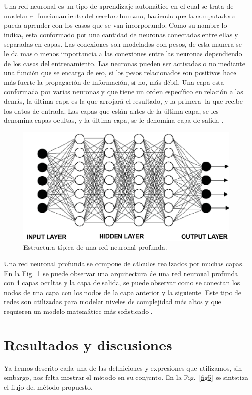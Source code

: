 \documentclass[conference]{IEEEtran}
\begin{document}
Una red neuronal es un tipo de aprendizaje automático en el cual se trata de modelar el funcionamiento del cerebro humano, haciendo que la computadora pueda aprender con los casos que se van incorporando. Como su nombre lo indica, esta conformado por una cantidad de neuronas conectadas entre ellas y separadas en capas. Las conexiones son modeladas con pesos, de esta manera se le da mas o menos importancia a las conexiones entre las neuronas dependiendo de los casos del entrenamiento. Las neuronas pueden ser activadas o no mediante una función que se encarga de eso, si los pesos relacionados son positivos hace más fuerte la propagación de información, si no, más débil. Una capa esta conformada por varias neuronas y que tiene un orden específico en relación a las demás, la última capa es la que arrojará el resultado, y la primera, la que recibe los datos de entrada. Las capas que están antes de la última capa, se les denomina capas ocultas, y la última capa, se le denomina capa de salida \cite{b11}. 

\begin{figure}[htbp]
	\centerline{\includegraphics[scale=0.6]{fig4.png}}
	\caption{Estructura típica de una red neuronal profunda.}
	\label{fig4}
\end{figure}

Una red neuronal profunda se compone de cálculos realizados por muchas capas. En la Fig.~\ref{fig4} se puede observar una arquitectura de una red neuronal profunda con 4 capas ocultas y la capa de salida, se puede observar como se conectan los nodos de una capa con los nodos de la capa anterior y la siguiente. Este tipo de redes son utilizadas para modelar niveles de complejidad más altos y que requieren un modelo matemático más sofisticado \cite{b12}.


\section{Resultados y discusiones}
Ya hemos descrito cada una de las definiciones y expresiones que utilizamos, sin embargo, nos falta mostrar el método en su conjunto. En la Fig.~\ref{fig5} se sintetiza el flujo del método propuesto. 
\end{document}
